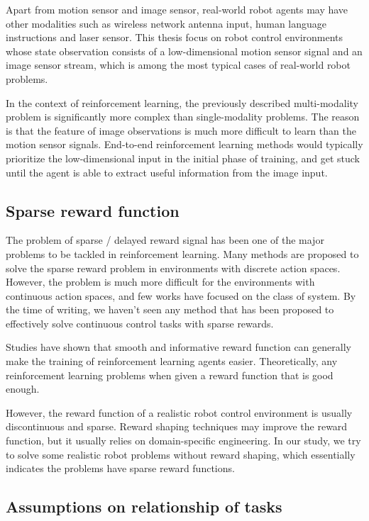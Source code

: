 Apart from motion sensor and image sensor, real-world robot agents may have other modalities such as wireless network antenna input, human language instructions and laser sensor. This thesis focus on robot control environments whose state observation consists of a low-dimensional motion sensor signal and an image sensor stream, which is among the most typical cases of real-world robot problems.

In the context of reinforcement learning, the previously described multi-modality problem is significantly more complex than single-modality problems. The reason is that the feature of image observations is much more difficult to learn than the motion sensor signals. End-to-end reinforcement learning methods would typically prioritize the low-dimensional input in the initial phase of training, and get stuck until the agent is able to extract useful information from the image input.

\subsection{Sparse reward function}
The problem of sparse / delayed reward signal has been one of the major problems to be tackled in reinforcement learning. Many methods are proposed to solve the sparse reward problem in environments with discrete action spaces. However, the problem is much more difficult for the environments with continuous action spaces, and few works have focused on the class of system. By the time of writing, we haven't seen any method that has been proposed to effectively solve continuous control tasks with sparse rewards.

Studies have shown that smooth and informative reward function can generally make the training of reinforcement learning agents easier. Theoretically, any reinforcement learning problems when given a reward function that is good enough.

However, the reward function of a realistic robot control environment is usually discontinuous and sparse. Reward shaping techniques may improve the reward function, but it usually relies on domain-specific engineering. In our study, we try to solve some realistic robot problems without reward shaping, which essentially indicates the problems have sparse reward functions.


\subsection{Assumptions on relationship of tasks}

